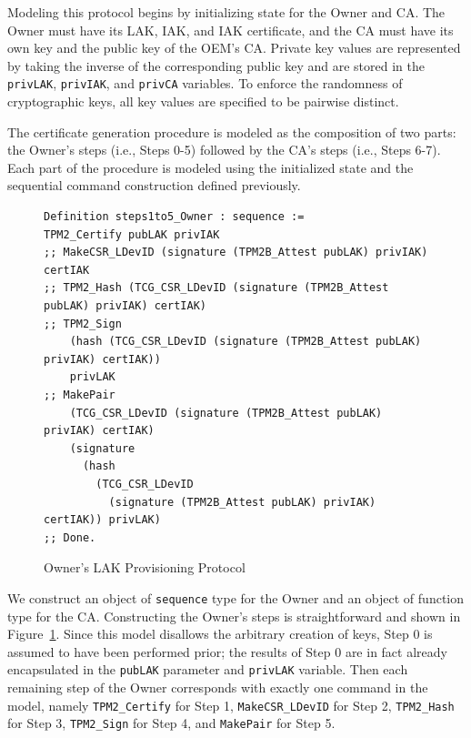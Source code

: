 \documentclass[runningheads]{llncs}
\begin{document}
Modeling this protocol begins by initializing state for the Owner and
CA. The Owner must have its LAK, IAK, and IAK certificate, and the CA
must have its own key and the public key of the OEM's CA.  Private key
values are represented by taking the inverse of the corresponding
public key and are stored in the \verb|privLAK|, \verb|privIAK|, and
\verb|privCA| variables. To enforce the randomness of cryptographic
keys, all key values are specified to be pairwise distinct.




The certificate generation procedure is modeled as the composition of
two parts: the Owner's steps (i.e., Steps 0-5) followed by the CA's
steps (i.e., Steps 6-7).  Each part of the procedure is modeled using
the initialized state and the sequential command construction defined
previously.

\begin{figure}[hpbt]
\begin{lstlisting}[language=Coq]
Definition steps1to5_Owner : sequence :=
TPM2_Certify pubLAK privIAK
;; MakeCSR_LDevID (signature (TPM2B_Attest pubLAK) privIAK) certIAK
;; TPM2_Hash (TCG_CSR_LDevID (signature (TPM2B_Attest pubLAK) privIAK) certIAK)
;; TPM2_Sign 
    (hash (TCG_CSR_LDevID (signature (TPM2B_Attest pubLAK) privIAK) certIAK))
    privLAK
;; MakePair 
    (TCG_CSR_LDevID (signature (TPM2B_Attest pubLAK) privIAK) certIAK) 
    (signature
      (hash
        (TCG_CSR_LDevID
          (signature (TPM2B_Attest pubLAK) privIAK) certIAK)) privLAK)
;; Done. 
\end{lstlisting}
\caption{Owner's LAK Provisioning Protocol}
\label{fig:lak_model_Owner}
\end{figure}

We construct an object of \verb|sequence| type for the Owner and an
object of function type for the CA. Constructing the Owner's steps is
straightforward and shown in Figure~\ref{fig:lak_model_Owner}. Since
this model disallows the arbitrary creation of keys, Step 0 is assumed
to have been performed prior; the results of Step 0 are in fact
already encapsulated in the \verb|pubLAK| parameter and \verb|privLAK|
variable. Then each remaining step of the Owner corresponds with
exactly one command in the model, namely \verb|TPM2_Certify| for Step
1, \verb|MakeCSR_LDevID| for Step 2, \verb|TPM2_Hash| for Step 3,
\verb|TPM2_Sign| for Step 4, and \verb|MakePair| for Step 5.
\end{document}
